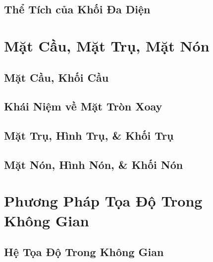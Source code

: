 \documentclass[oneside]{book}
\numberwithin{equation}{section}
\begin{document}

\section{Thể Tích của Khối Đa Diện}


\chapter{Mặt Cầu, Mặt Trụ, Mặt Nón}

\section{Mặt Cầu, Khối Cầu}


\section{Khái Niệm về Mặt Tròn Xoay}


\section{Mặt Trụ, Hình Trụ, \& Khối Trụ}


\section{Mặt Nón, Hình Nón, \& Khối Nón}


\chapter{Phương Pháp Tọa Độ Trong Không Gian}

\section{Hệ Tọa Độ Trong Không Gian}
\end{document}
